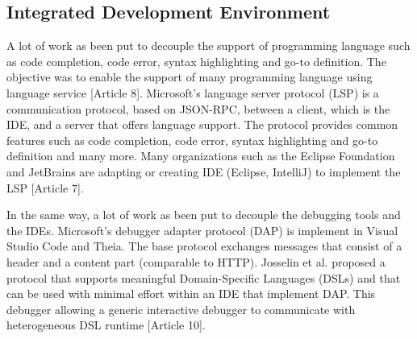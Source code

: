  \subsection{Integrated Development Environment}
 


A lot of work as been put to decouple the support of programming language such as code completion, code error, syntax highlighting and go-to definition. The objective was to enable the support of many programming language using language service [Article 8]. Microsoft's language server protocol (LSP) is a communication protocol, based on JSON-RPC, between a client, which is the IDE, and a server that offers language support. The protocol provides common features such as code completion, code error, syntax highlighting and go-to definition and many more. Many organizations such as the Eclipse Foundation and JetBrains are adapting or creating IDE (Eclipse, IntelliJ) to implement the LSP [Article 7]. 

In the same way, a lot of work as been put to decouple the debugging tools and the IDEs. Microsoft's debugger adapter protocol (DAP) is implement in Visual Studio Code and Theia. The base protocol exchanges messages that consist of a header and a content part (comparable to HTTP). Josselin et al. proposed a protocol that supports meaningful Domain-Specific Languages (DSLs) and that can be used with minimal effort within an IDE that implement DAP. This debugger allowing a generic interactive debugger to communicate with heterogeneous DSL runtime [Article 10]. 

